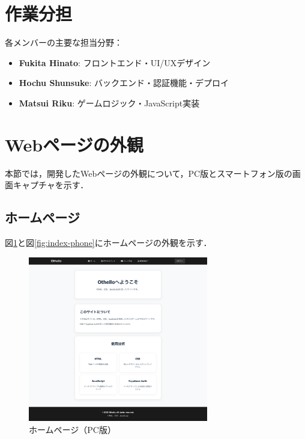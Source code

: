 \documentclass[10pt, a4paper]{jsarticle}
\begin{document}
\section{作業分担}

各メンバーの主要な担当分野：
\begin{itemize}
    \item \textbf{Fukita Hinato}: フロントエンド・UI/UXデザイン
    \item \textbf{Hochu Shunsuke}: バックエンド・認証機能・デプロイ
    \item \textbf{Matsui Riku}: ゲームロジック・JavaScript実装
\end{itemize}

\section{Webページの外観}

本節では，開発したWebページの外観について，PC版とスマートフォン版の画面キャプチャを示す．

\subsection{ホームページ}
図\ref{fig:index-pc}と図\ref{fig:index-phone}にホームページの外観を示す．

\begin{figure}[H]
\centering
\includegraphics[width=0.7\textwidth]{img/index-pc.png}
\caption{ホームページ（PC版）}
\label{fig:index-pc}
\end{figure}
\end{document}
